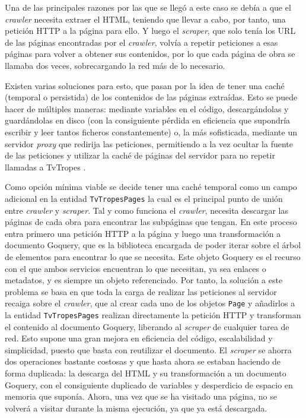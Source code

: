 Una de las principales razones por las que se llegó a este caso se debía a que
el \textit{crawler} necesita extraer el HTML, teniendo que llevar a cabo, por
tanto, una petición HTTP a la página para ello. Y luego el \textit{scraper}, que
solo tenía los URL de las páginas encontradas por el \textit{crawler}, volvía a
repetir peticiones a esas páginas para volver a obtener sus contenidos, por lo
que cada página de obra se llamaba dos veces, sobrecargando la red más de lo
necesario.

Existen varias soluciones para esto, que pasan por la idea de tener una caché
(temporal o persistida) de los contenidos de las páginas extraídas. Esto se
puede hacer de múltiples maneras: mediante variables en el código,
descargándolas y guardándolas en disco (con la consiguiente pérdida en
eficiencia que supondría escribir y leer tantos ficheros constantemente) o, la
más sofisticada, mediante un servidor \textit{proxy} que redirija las
peticiones, permitiendo a la vez ocultar la fuente de las peticiones y utilizar
la caché de páginas del servidor para no repetir llamadas a TvTropes
\cite{apress2018scraping}.

Como opción mínima viable se decide tener una caché temporal como un campo
adicional en la entidad \texttt{TvTropesPages} la cual es el principal punto de
unión entre \textit{crawler} y \textit{scraper}. Tal y como funciona el
\textit{crawler}, necesita descargar las páginas de cada obra para encontrar las
subpáginas que tengan. En este proceso entra primero una petición HTTP a la
página y luego una transformación a documento Goquery, que es la biblioteca
encargada de poder iterar sobre el árbol de elementos para encontrar lo que se
necesita. Este objeto Goquery es el recurso con el que ambos servicios
encuentran lo que necesitan, ya sea enlaces o metadatos, y es siempre un objeto
referenciado. Por tanto, la solución a este problema se basa en que toda la
carga de realizar las peticiones al servidor recaiga sobre el \textit{crawler},
que al crear cada uno de los objetos \texttt{Page} y añadirlos a la entidad \texttt{TvTropesPages} realizan 
directamente la petición HTTP y transforman el
contenido al documento Goquery, liberando al \textit{scraper} de cualquier tarea
de red. Esto supone una gran mejora en eficiencia del código, escalabilidad y
simplicidad, puesto que basta con reutilizar el documento. El
\textit{scraper} se ahorra dos operaciones bastante costosas y que hasta ahora
se estaban haciendo de forma duplicada: la descarga del HTML y su transformación
a un documento Goquery, con el consiguiente duplicado de variables y desperdicio
de espacio en memoria que suponía. Ahora, una vez que se ha visitado una página,
no se volverá a visitar durante la misma ejecución, ya que ya está descargada.

